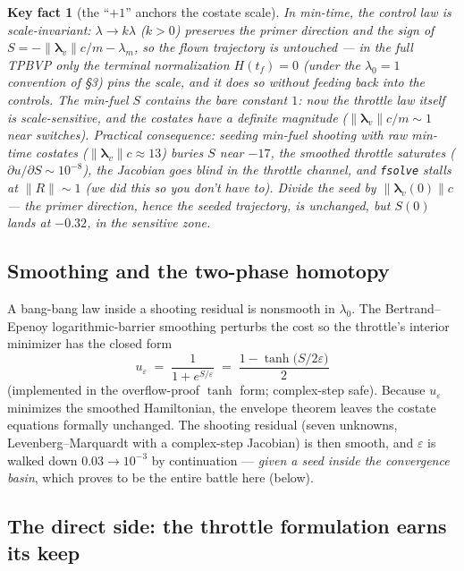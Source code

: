 \documentclass[11pt,letterpaper]{article}
\theoremstyle{noteplain}
\newtheorem*{keyfact}{Key fact}
\newcommand{\lamv}{\bm{\lambda}_v}
\newcommand{\lamm}{\lambda_m}
\newcommand{\code}[1]{\texttt{#1}}
\begin{document}
\begin{keyfact}[the ``$+1$'' anchors the costate scale]
In min-time, the \emph{control law} is scale-invariant: $\lambda \to
k\lambda$ ($k>0$) preserves the primer direction and the sign of
$S = -\|\lamv\|c/m - \lamm$, so the flown trajectory is untouched --- in
the full TPBVP only the terminal normalization $H(t_f)=0$ (under the
$\lambda_0 = 1$ convention of \S3) pins the scale, and it does so
without feeding back into the controls. The min-fuel $S$ contains the
bare constant $1$: now the \emph{throttle law itself} is
scale-sensitive, and the costates have a definite magnitude
($\|\lamv\| c/m \sim 1$ near switches). Practical consequence: seeding min-fuel shooting with raw
min-time costates ($\|\lamv\|c \approx 13$) buries $S$ near $-17$, the
smoothed throttle saturates ($\partial u/\partial S \sim 10^{-8}$), the
Jacobian goes blind in the throttle channel, and \code{fsolve} stalls at
$\|R\| \sim 1$ (we did this so you don't have to). Divide the seed by
$\|\lamv(0)\|c$ --- the primer direction, hence the seeded trajectory, is
unchanged, but $S(0)$ lands at $-0.32$, in the sensitive zone.
\end{keyfact}

\subsection*{Smoothing and the two-phase homotopy}

A bang-bang law inside a shooting residual is nonsmooth in $\lambda_0$.
The Bertrand--Epenoy logarithmic-barrier smoothing perturbs the cost so
the throttle's interior minimizer has the closed form
\[
  u_\varepsilon \;=\; \frac{1}{1 + e^{S/\varepsilon}}
  \;=\; \frac{1 - \tanh\bigl(S/2\varepsilon\bigr)}{2}
\]
(implemented in the overflow-proof $\tanh$ form; complex-step safe).
Because $u_\varepsilon$ minimizes the smoothed Hamiltonian, the envelope
theorem leaves the costate equations formally unchanged. The shooting
residual (seven unknowns, Levenberg--Marquardt with a complex-step
Jacobian) is then smooth, and $\varepsilon$ is walked down
$0.03 \to 10^{-3}$ by continuation --- \emph{given a seed inside the
convergence basin}, which proves to be the entire battle here (below).

\subsection*{The direct side: the throttle formulation earns its keep}
\end{document}
